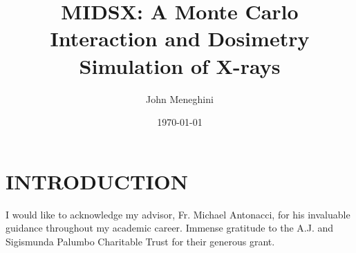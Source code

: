 \documentclass[%
 aip,
cp,  %
 amsmath,amssymb,%
reprint,%
]{revtex4-2}
\begin{document}
\title{MIDSX: A Monte Carlo Interaction and Dosimetry Simulation of X-rays}%

\author{John Meneghini} %

\date{\today} %

\begin{abstract}

\end{abstract}

\maketitle

\section{INTRODUCTION}







% 










\begin{acknowledgments}
    I would like to acknowledge my advisor, Fr. Michael Antonacci, for his invaluable guidance throughout my academic career. Immense gratitude to the A.J. and Sigismunda Palumbo Charitable Trust for their generous grant.
\end{acknowledgments}


\end{document}
